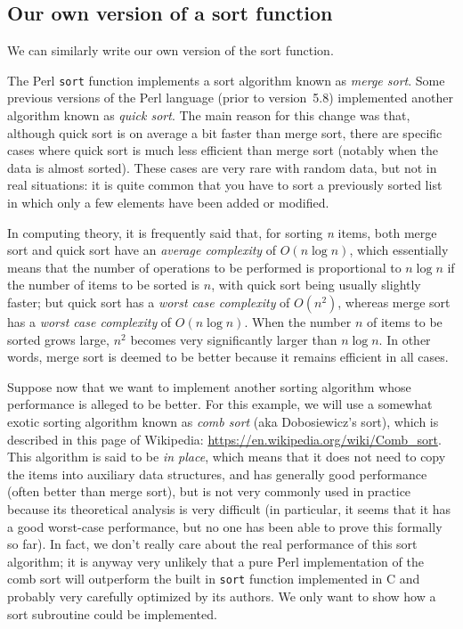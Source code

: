 \subsection{Our own version of a sort function}
\label{combsort}

We can similarly write our own version of the sort 
function. 

The Perl {\tt sort} function implements a sort 
algorithm known as \emph{merge sort}.  Some 
previous versions of the Perl language (prior to 
version~5.8) implemented another algorithm known 
as \emph{quick sort}. The main reason for this 
change was that, although quick sort is on average  
a bit faster than merge sort, there are specific 
cases where quick sort is much less efficient than 
merge sort (notably when the data is almost sorted). 
These cases are very rare with random data, but not 
in real situations: it is quite common that you have 
to sort a previously sorted list in which only a 
few elements have been added or modified.

In computing theory, it is frequently said that, for 
sorting \emph{n} items, both merge sort and quick 
sort have an \emph{average complexity} of $O(n \log n)$, 
which essentially means that the number of operations 
to be performed is proportional to $n \log n$ if 
the number of items to be sorted is $n$, 
with quick sort being usually slightly faster; but 
quick sort has a \emph{worst case complexity} of 
$O(n^{2})$, whereas merge sort has a \emph{worst case 
complexity} of $O(n \log n)$. When the number $n$ of 
items to be sorted grows large, $n^{2}$ becomes 
very significantly larger than $n \log n$. In other 
words, merge sort is deemed to be better because it 
remains efficient in all cases.

Suppose now that we want to implement another sorting 
algorithm whose performance is alleged to be better. 
For this example, we will use a somewhat exotic sorting 
algorithm known as \emph{comb sort} (aka Dobosiewicz's 
sort), which is described in this page of Wikipedia:
\url{https://en.wikipedia.org/wiki/Comb_sort}. This 
algorithm is said to be \emph{in place}, which means that 
it does not need to copy the items into auxiliary data 
structures, and has generally good performance (often better 
than merge sort), but is not very commonly used in 
practice because its theoretical analysis is very difficult 
(in particular, it seems that it has a good worst-case 
performance, but no one has been able to prove this 
formally so far). In fact, we don't really care about 
the real performance of this sort algorithm; it is 
anyway very unlikely that a pure Perl implementation 
of the comb sort will outperform the built in 
{\tt sort} function implemented in C and probably very 
carefully optimized by its authors. We only want to 
show how a sort subroutine could be implemented.

